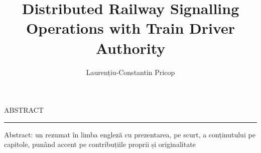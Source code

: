 \documentclass[12pt]{report}
\begin{document}
\title{Distributed Railway Signalling Operations with Train Driver Authority}					   
\author{Laurențiu-Constantin Pricop}											
				
\maketitle


\newpage
\thispagestyle{empty}
\mbox{}
\newpage
{} 

\cleardoublepage
ABSTRACT
\vspace{0.5cm}	
\hrule
\vspace{0.5cm}	

Abstract: un rezumat în limba engleză cu prezentarea, pe scurt, a conținutului pe capitole, punând accent pe contribuțiile proprii și originalitate



\tableofcontents


\newpage
{}










\end{document}
